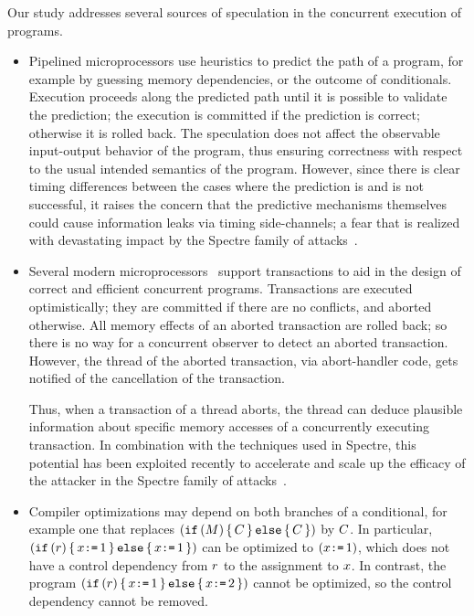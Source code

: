 Our study addresses several sources of speculation in the concurrent
execution of programs.
\begin{itemize}

\item Pipelined microprocessors use heuristics to predict the path of a
  program, for example by guessing memory dependencies, or the outcome of
  conditionals. Execution proceeds along the predicted path until it
  is possible to validate the prediction; the execution is committed
  if the prediction is correct; otherwise it is rolled
  back.  The speculation does not affect the observable input-output
  behavior of the program, thus ensuring correctness with respect to
  the usual intended semantics of the program. However, since there is
  clear timing differences between the cases where the prediction is
  and is not successful, it raises the concern that the predictive
  mechanisms themselves could cause information leaks via timing
  side-channels; a fear that is realized with devastating impact by
  the Spectre family of attacks~\cite{DBLP:journals/corr/abs-1801-01203}.

\item Several modern microprocessors~\cite{ChongSW18} support transactions
  to aid in the design of correct and efficient concurrent
  programs. Transactions are executed optimistically; they are
  committed if there are no conflicts, and aborted otherwise. All
  memory effects of an aborted transaction are rolled back; so there
  is no way for a concurrent observer to detect an aborted
  transaction.  However, the thread of the aborted transaction, via
  abort-handler code, gets notified of the cancellation of the
  transaction.

  Thus, when a transaction of a thread aborts, the thread can deduce
  plausible information about specific memory accesses of a
  concurrently executing transaction. In combination with the
  techniques used in Spectre, this potential has been exploited
  recently to accelerate and scale up the efficacy of the attacker in
  the Spectre family of attacks~\cite{DBLP:conf/uss/DisselkoenKPT17}.

\item Compiler optimizations may depend on both branches of
  a conditional, for example one that replaces
  $(\texttt{if}\,(M)\,\{\, C \,\}\,\texttt{else}\,\{\, C \,\})$ by $C$.
  In particular, $(\texttt{if}\,(r)\,\{\, x\texttt{:=}\,1 \,\}\,\texttt{else}\,\{\, x\texttt{:=}\,1 \,\})$
  can be optimized to $(x\texttt{:=}\,1)$, which does not have a control
  dependency from $r$ to the assignment to $x$.
  In contrast, the program $(\texttt{if}\,(r)\,\{\, x\texttt{:=}\,1 \,\}\,\texttt{else}\,\{\, x\texttt{:=}\,2 \,\})$
  cannot be optimized, so the control dependency cannot be removed.


\end{itemize}

